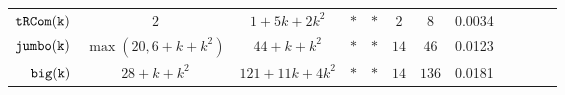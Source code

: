 {\begin {table}[H]
\begin{center}
{\begin{tabular}{ | >{\tiny}r | c | c | c | c | c | c | c | c | c | c | c |}
         $  \mathtt{tRCom(k)}$ &  $ 2$ & $ 1 + 5k + 2 k^2 $  &  $ * $   &   $* $ & $2$ & $8$ & 0.0034  \\
         $  \mathtt{{jumbo(k)}}$ & $  \max(20, 6+k+k^2)$   &   $ {44+k+k^2} $  &  $ * $   &  $* $ & $14$ & $46$ & 0.0123 \\
         $  {\mathtt{big(k)}} $ &   $28 + k + k^2$ &  $121+11k+4k^2 $  &  $ * $   &  $* $ & $14$ & $136$ & 0.0181 \\
        \hline \hline 
        \end{tabular}
}
\end{center}
\end{table}
}


